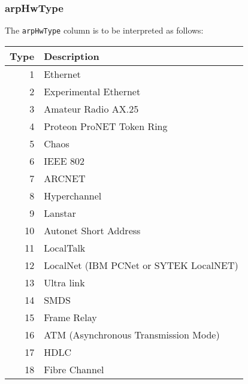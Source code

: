 \documentclass[documentation]{subfiles}
\begin{document}
\subsubsection{arpHwType}\label{arpHwType}
The {\tt arpHwType} column is to be interpreted as follows:\\
\begin{minipage}{.46\textwidth}
    \small
    \begin{longtable}{rl}
        \toprule
        {\bf Type} & {\bf Description}\\
        \midrule\endhead%
        1 & Ethernet\\
        2 & Experimental Ethernet\\
        3 & Amateur Radio AX.25\\
        4 & Proteon ProNET Token Ring\\
        5 & Chaos\\
        6 & IEEE 802\\
        7 & ARCNET\\
        8 & Hyperchannel\\
        9 & Lanstar\\
        10 & Autonet Short Address\\
        11 & LocalTalk\\
        12 & LocalNet (IBM PCNet or SYTEK LocalNET)\\
        13 & Ultra link\\
        14 & SMDS\\
        15 & Frame Relay\\
        16 & ATM (Asynchronous Transmission Mode)\\
        17 & HDLC\\
        18 & Fibre Channel\\
        \bottomrule
    \end{longtable}
\end{minipage}
\hfill
\end{document}
